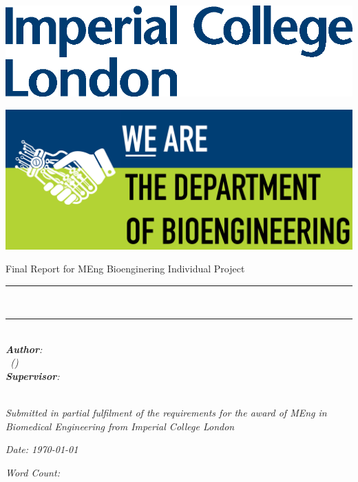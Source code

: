 \begin{titlepage}
\Large

\begin{minipage}{0.4\textwidth}
    \includegraphics[width=\textwidth]{figures/Imperial.eps}
\end{minipage}
\hfill
\begin{minipage}{0.4\textwidth}
\begin{flushright}
    \includegraphics[width=.9\textwidth]{figures/Bioeng.png}
\end{flushright}
\end{minipage}

\vspace{1.5cm}

\begin{center}
    {\huge Final Report for MEng Bioenginering Individual Project} \\ [1cm]
    \rule{\textwidth}{.1cm} \\[0.4cm]
    {\Huge \textbf{\reporttitle}}
    \rule{\textwidth}{.1cm} \\ [1.5cm]

    \textit{\textbf{Author}: \\ \reportauthor \ (\cid)} \\ [1cm]
    \textit{\textbf{Supervisor}: \\ \reportsupervisor} \\ [1cm]

    \vspace{2cm}

    \textit{Submitted in partial fulfilment of the requirements for the award of MEng in Biomedical Engineering from Imperial College London}

    \vfill
    
    \begin{minipage}{0.5\textwidth}
    \centering
        \textit{Date: \today} \\ [1cm]
    \end{minipage}
    \hfill
    \begin{minipage}{0.4\textwidth}
    \centering
        \textit{Word Count: \wordcount} \\ [1cm]
    \end{minipage}
\end{center}

\end{titlepage}